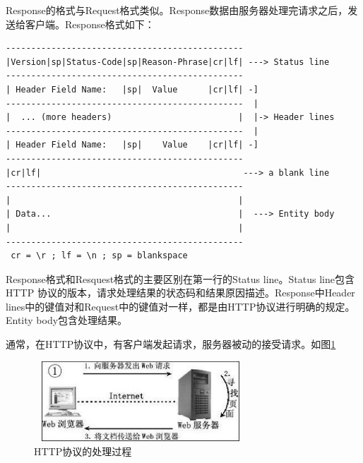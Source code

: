 \documentclass[twoside, xetex]{report}
\begin{document}
 	Response的格式与Request格式类似。Response数据由服务器处理完请求之后，发送给客户端。Response格式如下：
\begin{verbatim}
-----------------------------------------------
|Version|sp|Status-Code|sp|Reason-Phrase|cr|lf| ---> Status line
-----------------------------------------------
| Header Field Name:   |sp|  Value      |cr|lf| -]
-----------------------------------------------  |
|  ... (more headers)                         |  |-> Header lines
-----------------------------------------------  |
| Header Field Name:   |sp|    Value    |cr|lf| -]
-----------------------------------------------
|cr|lf|                                        ---> a blank line
-----------------------------------------------
|                                             |
| Data...                                     |  ---> Entity body
|                                             |
-----------------------------------------------
 cr = \r ; lf = \n ; sp = blankspace
\end{verbatim}
 	Response格式和Resquest格式的主要区别在第一行的Status line。Status line包含HTTP 协议的版本，请求处理结果的状态码和结果原因描述。Response中Header lines中的键值对和Request中的键值对一样，都是由HTTP协议进行明确的规定。Entity body包含处理结果。
 	
	通常，在HTTP协议中，有客户端发起请求，服务器被动的接受请求。如图\ref{httpbaike}
	\begin{figure}[htbp]
	\centering
	\includegraphics[height=3cm, width=8cm]{pics/httpbaike.eps}
	\caption{HTTP协议的处理过程}
	\label{httpbaike}
	\end{figure}
	
\end{document}
